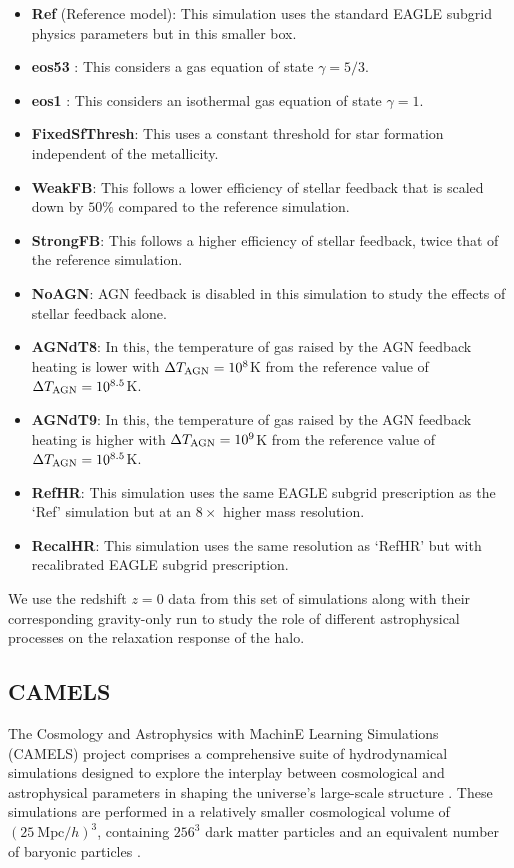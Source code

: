 \begin{itemize}
    \item \textbf{Ref} (Reference model): This simulation uses the standard EAGLE subgrid physics parameters but in this smaller box.
    \item \textbf{eos53} : This considers a gas equation of state $\gamma = 5/3$.
    \item \textbf{eos1} : This considers an isothermal gas equation of state $\gamma = 1$.
    \item \textbf{FixedSfThresh}: This uses a constant threshold for star formation independent of the metallicity.
    \item \textbf{WeakFB}: This follows a lower efficiency of stellar feedback that is scaled down by $50 \%$ compared to the reference simulation.
    \item \textbf{StrongFB}: This follows a higher efficiency of stellar feedback, twice that of the reference simulation.
    \item \textbf{NoAGN}: AGN feedback is disabled in this simulation to study the effects of stellar feedback alone.
    \item \textbf{AGNdT8}: In this, the temperature of gas raised by the AGN feedback heating is lower with $\Delta T_{\rm{AGN}} = 10^8$K from the reference value of $\Delta T_{\rm{AGN}} = 10^{8.5}$K.
    \item \textbf{AGNdT9}: In this, the temperature of gas raised by the AGN feedback heating is higher with $\Delta T_{\rm{AGN}} = 10^9$K from the reference value of $\Delta T_{\rm{AGN}} = 10^{8.5}$K.
    \item \textbf{RefHR}: This simulation uses the same EAGLE subgrid prescription as the `Ref' simulation but at an $8 \times$ higher mass resolution.
    \item \textbf{RecalHR}: This simulation uses the same resolution as `RefHR' but with recalibrated EAGLE subgrid prescription.
\end{itemize}

We use the redshift $z=0$ data from this set of simulations along with their corresponding gravity-only run to study the role of different astrophysical processes on the relaxation response of the halo.

\subsection{CAMELS}
\label{sec:sims-CAMELS}
The Cosmology and Astrophysics with MachinE Learning Simulations (CAMELS) project comprises a comprehensive suite of hydrodynamical simulations designed to explore the interplay between cosmological and astrophysical parameters in shaping the universe's large-scale structure \cite[][]{CAMELS_presentation}. These simulations are performed in a relatively smaller cosmological volume of $(25 \ \mathrm{Mpc}/h)^3$, containing $256^3$ dark matter particles and an equivalent number of baryonic particles \cite{CAMELS_DR1}.

